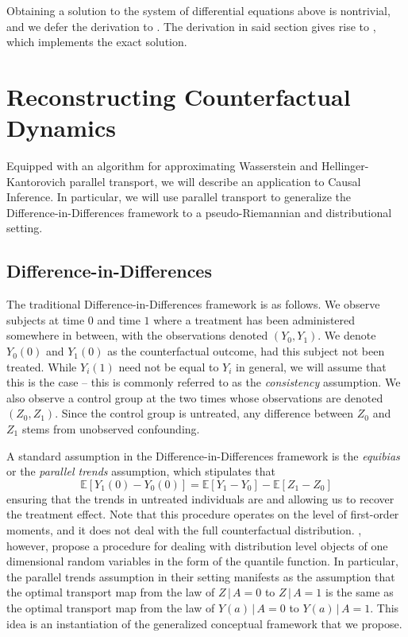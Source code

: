 \documentclass[11pt]{article}
\begin{document}
Obtaining a solution to the system of differential equations above is nontrivial, and we defer the derivation to . The derivation in said section gives rise to , which implements the exact solution. 


\section{Reconstructing Counterfactual Dynamics}

Equipped with an algorithm for approximating Wasserstein and Hellinger-Kantorovich parallel transport, we will describe an application to Causal Inference. In particular, we will use parallel transport to generalize the Difference-in-Differences framework \citep{meyer95} to a pseudo-Riemannian and distributional setting. 

\subsection{Difference-in-Differences}
The traditional Difference-in-Differences framework is as follows. We observe subjects at time $0$ and time $1$ where a treatment has been administered somewhere in between, with the observations denoted $(Y_0, Y_1)$. We denote $Y_0(0)$ and $Y_1(0)$ as the counterfactual outcome, had this subject not been treated. While $Y_i(1)$ need not be equal to $Y_i$ in general, we will assume that this is the case -- this is commonly referred to as the \textit{consistency} assumption. We also observe a control group at the two times whose observations are denoted $(Z_0, Z_1).$ Since the control group is untreated, any difference between $Z_0$ and $Z_1$ stems from unobserved confounding. 

A standard assumption in the Difference-in-Differences framework is the \textit{equibias} or the \textit{parallel trends} assumption, which stipulates that 
\[\mathbb{E}[Y_1(0) - Y_0(0)] = \mathbb{E}[Y_1 - Y_0] - \mathbb{E}[Z_1 - Z_0]\]
ensuring that the trends in untreated individuals are  \cite{abadie2005semiparametric} and allowing us to recover the treatment effect. Note that this procedure operates on the level of first-order moments, and it does not deal with the full counterfactual distribution. \citet{sofer2016}, however, propose a procedure for dealing with distribution level objects of one dimensional random variables in the form of the quantile function. In particular, the parallel trends assumption in their setting manifests as the assumption that the optimal transport map from the law of $Z \,| \, A = 0$ to $Z \, | \, A = 1$ is the same as the optimal transport map from the law of $Y(a) \, | \,A = 0$ to $Y(a) \, | \,A = 1.$ This idea is an instantiation of the generalized conceptual framework that we propose.
\end{document}
